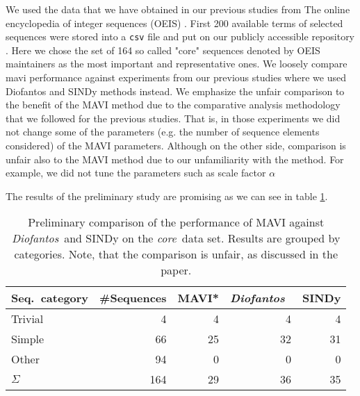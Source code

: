 \documentclass[runningheads]{llncs}
\newcommand{\DP}{\textsl{Diofantos}}
\newcommand{\core}{\textsl{core}}  %
\begin{document}
We used the data that we have obtained in our previous studies
from The online encyclopedia of integer sequences (OEIS) \cite{oeis}.
First 200 available terms of selected sequences were
stored into a \verb|csv| file and put on our publicly accessible repository
\cite{git diofantos}.
Here we chose the set of 164 so called 
 "core" sequences denoted by OEIS maintainers as the most important 
and representative ones.
We loosely compare mavi performance against experiments from our previous studies
where we used Diofantos and SINDy methods instead.
We emphasize the unfair comparison to the benefit of the MAVI method due to
the comparative analysis methodology that we followed for the previous studies.
That is, in those experiments we did not change some of the parameters 
(e.g. the number of sequence elements considered) of the MAVI parameters.
Although on the other side, comparison is unfair also to the MAVI method
due to our unfamiliarity with the method. 
For example, we did not tune 
the parameters such as scale factor $\alpha$

The results of the preliminary study are promising as we can see in table \ref{tab}.

\begin{table}[h]
\caption{Preliminary comparison of the performance of MAVI against \DP\ and SINDy on the \core\ data set. Results are grouped by categories.
Note, that the comparison is unfair, as discussed in the paper.
}
\label{tab}
\begin{tabular}{l|rrrr}
Seq.~category \hspace*{0.5cm} & \#Sequences & \hspace*{0.15cm} MAVI*  & \DP\ & \hspace*{0.15cm} SINDy  \\
\hline
Trivial & 4   & 4  & 4    & 4    \\
Simple  & 66 & 25  & 32  & 31     \\
Other   & 94  & 0  & 0    & 0      \\
\hline
\textbf{$\Sigma$}  & 164 & 29 & 36   & 35 
\end{tabular} 
\end{table}

\end{document}
